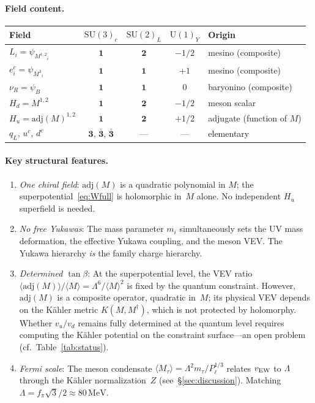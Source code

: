 \documentclass[12pt,a4paper]{article}
\newcommand{\SU}{\mathrm{SU}}
\newcommand{\UU}{\mathrm{U}}
\newcommand{\adj}{\mathrm{adj}}
\newcommand{\MeV}{\,\mathrm{MeV}}
\begin{document}
\paragraph{Field content.}
\begin{center}
\begin{tabular}{lcccl}
\toprule
Field & $\SU(3)_c$ & $\SU(2)_L$ & $\UU(1)_Y$ & Origin \\
\midrule
$L_i = \psi_{M^{1,2}{}_i}$ & $\mathbf{1}$ & $\mathbf{2}$ & $-1/2$ & mesino (composite) \\
$e^c_i = \psi_{M^3{}_i}$ & $\mathbf{1}$ & $\mathbf{1}$ & $+1$ & mesino (composite) \\
$\nu_R = \psi_B$ & $\mathbf{1}$ & $\mathbf{1}$ & $0$ & baryonino (composite) \\
$H_d = M^{1,2}$ & $\mathbf{1}$ & $\mathbf{2}$ & $-1/2$ & meson scalar \\
$H_u = \adj(M)^{1,2}$ & $\mathbf{1}$ & $\mathbf{2}$ & $+1/2$ & adjugate (function of $M$) \\
$q_L$, $u^c$, $d^c$ & $\mathbf{3}$, $\bar{\mathbf{3}}$, $\bar{\mathbf{3}}$ & --- & --- & elementary \\
\bottomrule
\end{tabular}
\end{center}

\paragraph{Key structural features.}
\begin{enumerate}
  \item \emph{One chiral field}: $\adj(M)$ is a quadratic polynomial in
    $M$; the superpotential~\eqref{eq:Wfull} is holomorphic in~$M$ alone.
    No independent $H_u$ superfield is needed.
  \item \emph{No free Yukawas}: The mass parameter $m_i$ simultaneously
    sets the UV mass deformation, the effective Yukawa coupling, and the
    meson VEV. The Yukawa hierarchy \emph{is} the family charge hierarchy.
  \item \emph{Determined $\tan\beta$}: At the superpotential level, the
    VEV ratio
    $\langle\adj(M)\rangle/\langle M\rangle = \Lambda^6/\langle M\rangle^2$
    is fixed by the quantum constraint. However, $\adj(M)$ is a
    composite operator, quadratic in~$M$; its physical VEV depends on
    the K\"ahler metric $K(M,M^\dagger)$, which is not protected by
    holomorphy. Whether $v_u/v_d$ remains fully determined at the
    quantum level requires computing the K\"ahler potential on the
    constraint surface---an open problem (cf.\ Table~\ref{tab:status}).
  \item \emph{Fermi scale}: The meson condensate
    $\langle M_\tau\rangle = \Lambda^2 m_\tau/P_\ell^{1/3}$ relates
    $v_{\rm EW}$ to $\Lambda$ through the K\"ahler normalization~$Z$
    (see~\S\ref{sec:discussion}). Matching
    $\Lambda = f_\pi\sqrt{3}/2 \approx 80\MeV$.
\end{enumerate}
\end{document}
